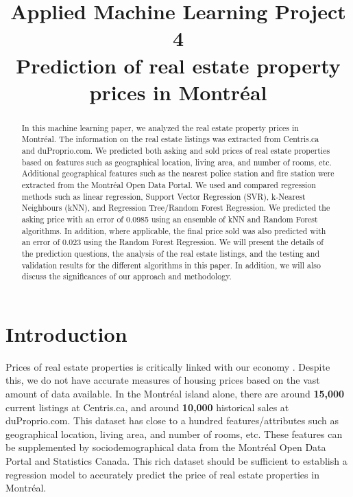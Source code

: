 \documentclass[conference]{IEEEtran}
\begin{document}
\title{Applied Machine Learning Project 4 \\ Prediction of real estate property prices in Montr\'eal}

\author{
\and
{}
\and
{}
}

\maketitle

\begin{abstract}
In this machine learning paper, we analyzed the real estate property prices in Montr\'eal. The information on the real estate listings was extracted from Centris.ca and duProprio.com. We predicted both asking and sold prices of real estate properties based on features such as geographical location, living area, and number of rooms, etc. Additional geographical features such as the nearest police station and fire station were extracted from the Montr\'eal Open Data Portal. We used and compared regression methods such as linear regression, Support Vector Regression (SVR), k-Nearest Neighbours (kNN), and Regression Tree/Random Forest Regression. We predicted the asking price with an error of 0.0985 using an ensemble of kNN and Random Forest algorithms. In addition, where applicable, the final price sold was also predicted with an error of 0.023 using the Random Forest Regression. We will present the details of the prediction questions, the analysis of the real estate listings, and the testing and validation results for the different algorithms in this paper. In addition, we will also discuss the significances of our approach and methodology.
\end{abstract}

\IEEEpeerreviewmaketitle

\section{Introduction}
Prices of real estate properties is critically linked with our economy \cite{NBERw13553}. Despite this, we do not have accurate measures of housing prices based on the vast amount of data available. In the Montr\'eal island alone, there are around \textbf{15,000} current listings at Centris.ca, and around \textbf{10,000} historical sales at duProprio.com. This dataset has close to a hundred features/attributes such as geographical location, living area, and number of rooms, etc. These features can be supplemented by sociodemographical data from the Montr\'eal Open Data Portal and Statistics Canada. This rich dataset should be sufficient to establish a regression model to accurately predict the price of real estate properties in Montr\'eal.
\end{document}
